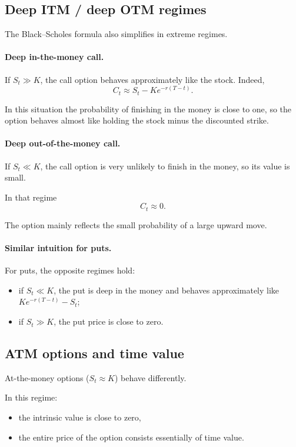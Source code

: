 \documentclass[11pt]{article}
\newcommand{\1}{\mathbf{1}}
\theoremstyle{plain}
\theoremstyle{definition}
\theoremstyle{remark}
\begin{document}
\subsection{Deep ITM / deep OTM regimes}

The Black--Scholes formula also simplifies in extreme regimes.

\paragraph{Deep in-the-money call.}

If \(S_t \gg K\), the call option behaves approximately like the stock.
Indeed,
\[
C_t \approx S_t - K e^{-r(T-t)}.
\]

In this situation the probability of finishing in the money is close to
one, so the option behaves almost like holding the stock minus the
discounted strike.

\paragraph{Deep out-of-the-money call.}

If \(S_t \ll K\), the call option is very unlikely to finish in the money,
so its value is small.

In that regime
\[
C_t \approx 0.
\]

The option mainly reflects the small probability of a large upward move.

\paragraph{Similar intuition for puts.}

For puts, the opposite regimes hold:
\begin{itemize}[leftmargin=1.4em]
    \item if \(S_t \ll K\), the put is deep in the money and behaves
    approximately like \(K e^{-r(T-t)}-S_t\);
    \item if \(S_t \gg K\), the put price is close to zero.
\end{itemize}

\subsection{ATM options and time value}

At-the-money options (\(S_t \approx K\)) behave differently.

In this regime:
\begin{itemize}[leftmargin=1.4em]
\item the intrinsic value is close to zero,
\item the entire price of the option consists essentially of time value.
\end{itemize}
\end{document}
